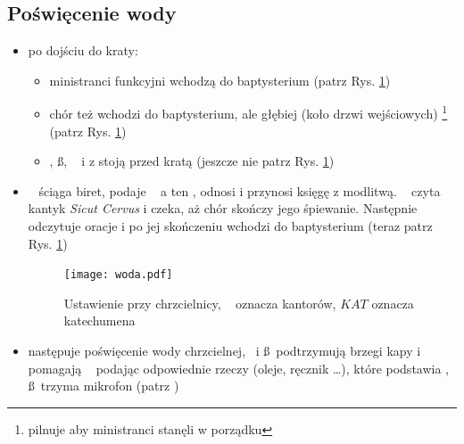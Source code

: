 \subsection{Poświęcenie wody}
\begin{itemize}
	\item po dojściu do kraty:
	      \begin{itemize}
		      \item ministranci funkcyjni wchodzą do baptysterium (patrz Rys.
		            \ref{fig:woda})
		      \item chór też wchodzi do baptysterium, ale głębiej (koło drzwi
		            wejściowych) \footnote{ pilnuje aby ministranci stanęli
			            w porządku} (patrz Rys.
		            \ref{fig:woda})
		      \item \ii, \ss, \dd~ i  z  stoją przed kratą (jeszcze nie
		            patrz Rys. \ref{fig:woda})
	      \end{itemize}
	\item \ii~ ściąga biret, podaje \dd~ a ten ,  odnosi i przynosi
	      księgę z modlitwą. \ii~ czyta kantyk \textit{Sicut Cervus} i czeka, aż
	      chór skończy jego śpiewanie. Następnie odczytuje oracje
	       i po jej skończeniu wchodzi do baptysterium
	      (teraz patrz Rys. \ref{fig:woda})
	      \begin{figure}[h!]
		      \centering
		      \texttt{[image: woda.pdf]}
		      \caption{Ustawienie przy chrzcielnicy, \spiew~ oznacza kantorów,
			      $KAT$ oznacza katechumena}
		      \label{fig:woda}
	      \end{figure}
	\item następuje poświęcenie wody chrzcielnej, \dd~i \ss~podtrzymują brzegi
	      kapy i pomagają \ii~ podając odpowiednie rzeczy (oleje, ręcznik
	      \dots), które podstawia , \ss~trzyma mikrofon  (patrz
	      \textit{})
\end{itemize}
